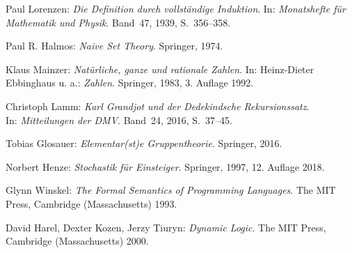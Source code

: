 \begin{thebibliography}{00}
 Paul Lorenzen:
\emph{Die Definition durch vollständige Induktion}.
In: \emph{Monatshefte für Mathematik und Physik}.
Band~47, 1939, S.~356--358.

 Paul R. Halmos:
\emph{Naive Set Theory}. Springer, 1974.

 Klaus Mainzer:
\emph{Natürliche, ganze und rationale Zahlen}.
In: Heinz-Dieter Ebbinghaus u. a.: \emph{Zahlen}.
Springer, 1983, 3. Auflage 1992.

 Christoph Lamm:
\emph{Karl Grandjot und der Dedekindsche Rekursionssatz}.\\
In: \emph{Mitteilungen der DMV}. Band~24, 2016, S.~37--45.

 Tobias Glosauer:
\emph{Elementar(st)e Gruppentheorie}.
Springer, 2016.

 Norbert Henze: \emph{Stochastik für Einsteiger}.
Springer, 1997, 12. Auflage 2018.

 Glynn Winskel:
\emph{The Formal Semantics of Programming Languages}.
The MIT Press, Cambridge (Massachusetts) 1993.

 David Harel, Dexter Kozen, Jerzy Tiuryn:
\emph{Dynamic Logic}.
The MIT Press, Cambridge (Massachusetts) 2000.
\end{thebibliography}
